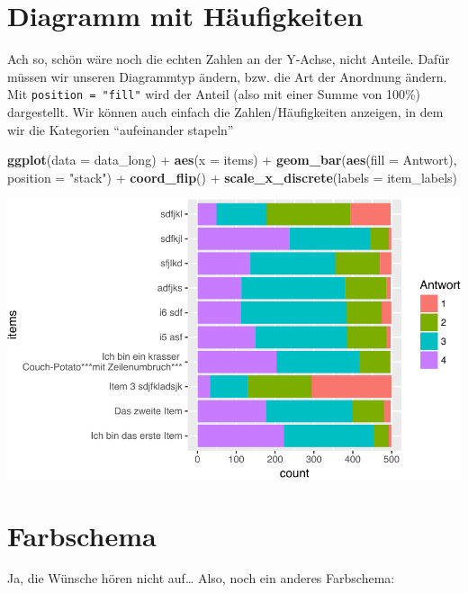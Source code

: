 \documentclass[12pt,ngerman,]{book}
\newenvironment{Shaded}{\begin{snugshade}}{\end{snugshade}}
\newcommand{\KeywordTok}[1]{\textcolor[rgb]{0.13,0.29,0.53}{\textbf{{#1}}}}
\newcommand{\DataTypeTok}[1]{\textcolor[rgb]{0.13,0.29,0.53}{{#1}}}
\newcommand{\StringTok}[1]{\textcolor[rgb]{0.31,0.60,0.02}{{#1}}}
\newcommand{\NormalTok}[1]{{#1}}
\renewenvironment{Shaded}{\begin{kframe}}{\end{kframe}}
\begin{document}
\section{Diagramm mit Häufigkeiten}\label{diagramm-mit-haufigkeiten}

Ach so, schön wäre noch die echten Zahlen an der Y-Achse, nicht Anteile.
Dafür müssen wir unseren Diagrammtyp ändern, bzw. die Art der Anordnung
ändern. Mit \texttt{position\ =\ "fill"} wird der Anteil (also mit einer
Summe von 100\%) dargestellt. Wir können auch einfach die
Zahlen/Häufigkeiten anzeigen, in dem wir die Kategorien ``aufeinander
stapeln''

\begin{Shaded}
\begin{Highlighting}[]
\KeywordTok{ggplot}\NormalTok{(}\DataTypeTok{data =} \NormalTok{data_long) +}
\StringTok{  }\KeywordTok{aes}\NormalTok{(}\DataTypeTok{x =} \NormalTok{items)  +}
\StringTok{  }\KeywordTok{geom_bar}\NormalTok{(}\KeywordTok{aes}\NormalTok{(}\DataTypeTok{fill =} \NormalTok{Antwort), }\DataTypeTok{position =} \StringTok{"stack"}\NormalTok{) +}
\StringTok{  }\KeywordTok{coord_flip}\NormalTok{() +}
\StringTok{  }\KeywordTok{scale_x_discrete}\NormalTok{(}\DataTypeTok{labels =} \NormalTok{item_labels) }
\end{Highlighting}
\end{Shaded}

\begin{center}\includegraphics[width=0.7\linewidth]{056_Fallstudie_Visualisierung_files/figure-latex/unnamed-chunk-15-1} \end{center}

\section{Farbschema}\label{farbschema}

Ja, die Wünsche hören nicht auf\ldots{} Also, noch ein anderes
Farbschema:
\end{document}
